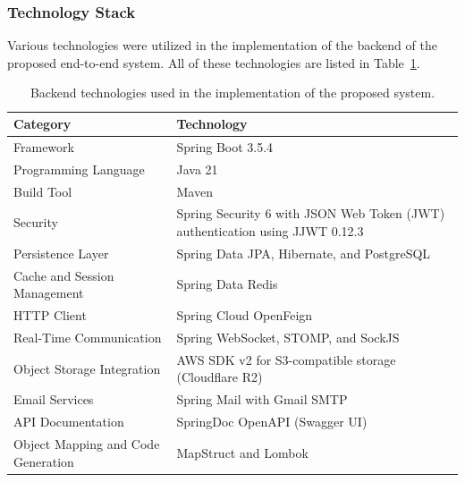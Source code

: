 \subsubsection{Technology Stack}
Various technologies were utilized in the implementation of the backend of the proposed end-to-end system. All of these technologies are listed in Table~\ref{tab:backend_technologies}.
\begin{table}[htbp]
	\centering
	\caption{Backend technologies used in the implementation of the proposed system.}
	\label{tab:backend_technologies}
	\begin{tabular}{|p{4cm}|p{8.5cm}|}
		\hline
		\textbf{Category} & \textbf{Technology} \\
		\hline
		
		Framework &
		Spring Boot 3.5.4 \\
		\hline
		
		Programming Language &
		Java 21 \\
		\hline
		
		Build Tool &
		Maven \\
		\hline
		
		Security &
		Spring Security 6 with JSON Web Token (JWT) authentication using JJWT 0.12.3 \\
		\hline
		
		Persistence Layer &
		Spring Data JPA, Hibernate, and PostgreSQL \\
		\hline
		
		Cache and Session Management &
		Spring Data Redis \\
		\hline
		
		HTTP Client &
		Spring Cloud OpenFeign \\
		\hline
		
		Real-Time Communication &
		Spring WebSocket, STOMP, and SockJS \\
		\hline
		
		Object Storage Integration &
		AWS SDK v2 for S3-compatible storage (Cloudflare R2) \\
		\hline
		
		Email Services &
		Spring Mail with Gmail SMTP \\
		\hline
		
		API Documentation &
		SpringDoc OpenAPI (Swagger UI) \\
		\hline
		
		Object Mapping and Code Generation &
		MapStruct and Lombok \\
		\hline
		
	\end{tabular}
\end{table}

